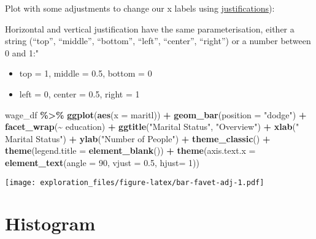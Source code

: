 \documentclass[
]{book}
\newenvironment{Shaded}{\begin{snugshade}}{\end{snugshade}}
\newcommand{\DataTypeTok}[1]{\textcolor[rgb]{0.13,0.29,0.53}{#1}}
\newcommand{\DecValTok}[1]{\textcolor[rgb]{0.00,0.00,0.81}{#1}}
\newcommand{\FloatTok}[1]{\textcolor[rgb]{0.00,0.00,0.81}{#1}}
\newcommand{\KeywordTok}[1]{\textcolor[rgb]{0.13,0.29,0.53}{\textbf{#1}}}
\newcommand{\NormalTok}[1]{#1}
\newcommand{\OperatorTok}[1]{\textcolor[rgb]{0.81,0.36,0.00}{\textbf{#1}}}
\newcommand{\StringTok}[1]{\textcolor[rgb]{0.31,0.60,0.02}{#1}}
\providecommand{\tightlist}{%
  \setlength{\itemsep}{0pt}\setlength{\parskip}{0pt}}
\begin{document}
Plot with some adjustments to change our x labels using \href{https://ggplot2.tidyverse.org/articles/ggplot2-specs.html}{justifications}):

Horizontal and vertical justification have the same parameterisation, either a string (``top'', ``middle'', ``bottom'', ``left'', ``center'', ``right'') or a number between 0 and 1:"

\begin{itemize}
\tightlist
\item
  top = 1, middle = 0.5, bottom = 0
\item
  left = 0, center = 0.5, right = 1
\end{itemize}

\begin{Shaded}
\begin{Highlighting}[]
\NormalTok{wage\_df }\OperatorTok{\%\textgreater{}\%}\StringTok{ }
\StringTok{  }\KeywordTok{ggplot}\NormalTok{(}\KeywordTok{aes}\NormalTok{(}\DataTypeTok{x =}\NormalTok{ maritl)) }\OperatorTok{+}
\StringTok{  }\KeywordTok{geom\_bar}\NormalTok{(}\DataTypeTok{position =} \StringTok{"dodge"}\NormalTok{) }\OperatorTok{+}
\StringTok{  }\KeywordTok{facet\_wrap}\NormalTok{(}\OperatorTok{\textasciitilde{}}\StringTok{ }\NormalTok{education) }\OperatorTok{+}\StringTok{ }
\StringTok{  }\KeywordTok{ggtitle}\NormalTok{(}\StringTok{"Marital Status"}\NormalTok{, }\StringTok{"Overview"}\NormalTok{) }\OperatorTok{+}
\StringTok{  }\KeywordTok{xlab}\NormalTok{(}\StringTok{" Marital Status"}\NormalTok{) }\OperatorTok{+}
\StringTok{  }\KeywordTok{ylab}\NormalTok{(}\StringTok{"Number of People"}\NormalTok{) }\OperatorTok{+}
\StringTok{  }\KeywordTok{theme\_classic}\NormalTok{() }\OperatorTok{+}
\StringTok{  }\KeywordTok{theme}\NormalTok{(}\DataTypeTok{legend.title =} \KeywordTok{element\_blank}\NormalTok{()) }\OperatorTok{+}
\StringTok{  }\KeywordTok{theme}\NormalTok{(}\DataTypeTok{axis.text.x =} \KeywordTok{element\_text}\NormalTok{(}\DataTypeTok{angle =} \DecValTok{90}\NormalTok{, }
                                   \DataTypeTok{vjust =} \FloatTok{0.5}\NormalTok{, }
                                   \DataTypeTok{hjust=}  \DecValTok{1}\NormalTok{))}
\end{Highlighting}
\end{Shaded}

\texttt{[image: exploration\_files/figure-latex/bar-favet-adj-1.pdf]}

\hypertarget{histogram}{%
\chapter{Histogram}\label{histogram}}
\end{document}
